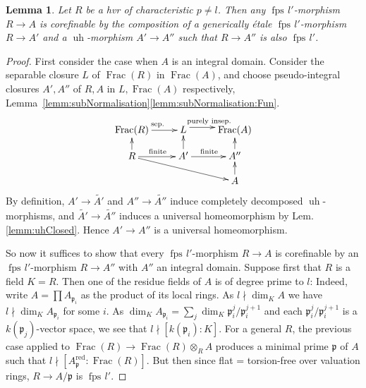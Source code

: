 \documentclass[10pt]{amsart}
\newtheorem{lemm}[theo]{Lemma}
\theoremstyle{definition}
\newtheorem{rema}[theo]{Remark}
\newcommand{\p}{\mathfrak{p}}
\DeclareMathOperator{\Frac}{Frac}
\newcommand{\fpsl}{{\operatorname{fps\!}l'}}
\newcommand{\uh}{\operatorname{uh}}
\newcommand{\red}{{\operatorname{red}}}
\begin{document}

\begin{lemm} \label{lemm:refRef}
Let $R$ be a hvr of characteristic $p \neq l$. Then any $\fpsl$-morphism $R \to A$ is corefinable by the composition of a generically étale $\fpsl$-morphism $R \to A'$ and a $\uh$-morphism $A' \to A''$ such that $R \to A''$ is also $\fpsl$.
\end{lemm}

\begin{proof}
First consider the case when $A$ is an integral domain. Consider the separable closure $L$ of $\Frac(R)$ in $\Frac(A)$, and choose pseudo-integral closures $A', A''$ of $R, A$ in $L, \Frac(A)$ respectively, Lemma~\ref{lemm:subNormalisation}\eqref{lemm:subNormalisation:Fun}.
\[ \xymatrix@R=12pt{
\Frac(R) \ar[r]^{\textrm{sep.}} & L \ar@<3pt>[r]^{\textrm{purely insep.}} & \Frac(A) \\
R \ar[r]^{\textrm{finite}} \ar[u] \ar[drr] & A' \ar[r]^{\textrm{finite}} \ar[u] & A'' \ar[u] \\
&& A \ar[u] 
} \]
By definition, $A' \to \widetilde{A'}$ and $A'' \to \widetilde{A''}$ induce completely decomposed $\uh$-morphisms, and $\widetilde{A'} \to \widetilde{A''}$ induces a universal homeomorphism by Lem.\ref{lemm:uhClosed}. Hence $A' \to A''$ is a universal homeomorphism.

So now it suffices to show that every $\fpsl$-morphism $R \to A$ is corefinable by an $\fpsl$-morphism $R \to A''$ with $A''$ an integral domain. Suppose first that $R$ is a field $K = R$. Then one of the residue fields of $A$ is of degree prime to $l$: Indeed, write $A = \prod A_{\p_i}$ as the product of its local rings. As $l \nmid \dim_K A$ we have $l \nmid \dim_K A_{\p_i}$ for some $i$. As $\dim_K A_{\p_i} = \sum_j \dim_K  \p_i^j / \p_i^{j+1}$ and each $\p_i^j / \p_i^{j+1}$ is a $k(\p_j)$-vector space, we see that $l \nmid [k(\p_i) : K]$. For a general $R$, the previous case applied to $\Frac(R) \to \Frac(R) \otimes_R A$ produces a minimal prime $\p$ of $A$ such that $l \nmid [A_\p^\red : \Frac(R)]$. But then since flat = torsion-free over valuation rings, $R \to A / \p$ is $\fpsl$.
\end{proof}
\end{document}
